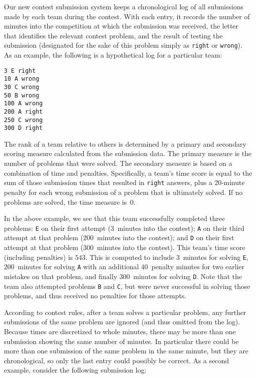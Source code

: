 
Our new contest submission system keeps a chronological log of all
submissions made by each team during the contest. With each entry, it
records the number of minutes into the competition at which the
submission was received, the letter that identifies the relevant
contest problem, and the result of testing the submission (designated
for the sake of this problem simply as {\tt right} or {\tt wrong}).
%
As an example, the following is a hypothetical log for a particular team:
%

\vspace{-12pt}
\begin{verbatim}
3 E right
10 A wrong
30 C wrong
50 B wrong
100 A wrong
200 A right
250 C wrong
300 D right
\end{verbatim}
\vspace{-12pt}

The rank of a team relative to others is determined by a primary and
secondary scoring measure calculated from the submission data. The
primary measure is the number of problems that were solved. The
secondary measure is based on a combination of time and penalties.
Specifically, a team's time score is equal to the sum of those
submission times that resulted in {\tt right} answers, plus a
20-minute penalty for each wrong submission of a problem that is
ultimately solved. If no problems are solved, the time measure is~$0$.

In the above example, we see that this team successfully completed
three problems: {\tt E} on their first attempt ($3$~minutes into the
contest); {\tt A} on their third attempt at that problem ($200$~minutes
into the contest); and {\tt D} on their first attempt at that problem
($300$~minutes into the contest).
%
This team's time score (including penalties) is $543$. This is
computed to include $3$~minutes for solving {\tt E}, $200$~minutes for
solving {\tt A} with an additional $40$~penalty
minutes for two earlier mistakes on that problem, and finally
$300$~minutes for solving {\tt D}.
%
Note that the team also attempted problems {\tt B} and {\tt C},
but were never successful in solving those problems, and thus received
no penalties for those attempts.

According to contest rules, after a team solves a particular problem,
any further submissions of the same problem are ignored (and thus omitted
from the log). Because times are discretized to whole minutes, there
may be more than one submission showing the same number of minutes.
In particular there could be more than one submission of the same
problem in the same minute, but they are chronological, so only the
last entry could possibly be correct.
%
As a second example, consider the following submission log:
%

